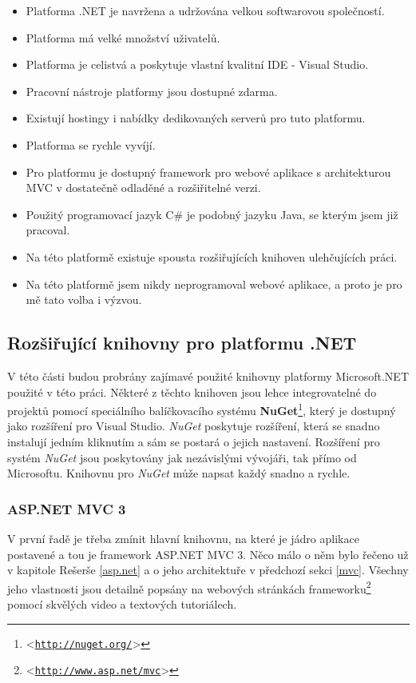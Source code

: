 \documentclass[11pt,twoside,a4paper]{book}
\let\oldUrl\url
\renewcommand\url[1]{<\texttt{\oldUrl{#1}}>}
\begin{document}
\begin{itemize}
\item Platforma .NET je navržena a udržována velkou softwarovou společností.
\item Platforma má velké množství uživatelů.
\item Platforma je celistvá a poskytuje vlastní kvalitní IDE - Visual Studio.
\item Pracovní nástroje platformy jsou dostupné zdarma.
\item Existují hostingy i nabídky dedikovaných serverů pro tuto platformu.
\item Platforma se rychle vyvíjí.
\item Pro platformu je dostupný framework pro webové aplikace s architekturou MVC v dostatečně odladěné a rozšiřitelné verzi.
\item Použitý programovací jazyk C\# je podobný jazyku Java, se kterým jsem již pracoval.
\item Na této platformě existuje spousta rozšiřujících knihoven ulehčujících práci.
\item Na této platformě jsem nikdy neprogramoval webové aplikace, a proto je pro mě tato volba i výzvou.
\end{itemize}


\subsection{Rozšiřující knihovny pro platformu .NET}
\label{subsec:roz}
V této části budou probrány zajímavé použité knihovny platformy Microsoft.NET použité v této práci. Některé z těchto knihoven jsou lehce integrovatelné do projektů pomocí speciálního balíčkovacího systému \textbf{NuGet}\footnote{\url{http://nuget.org/}}, který je dostupný jako rozšíření pro Visual Studio. \textit{NuGet} poskytuje rozšíření, která se snadno instalují jedním kliknutím a sám se postará o jejich nastavení. Rozšíření pro systém \textit{NuGet} jsou poskytovány jak nezávislými vývojáři, tak přímo od Microsoftu. Knihovnu pro \textit{NuGet} může napsat každý snadno a rychle.

\subsubsection{ASP.NET MVC 3}
V první řadě je třeba zmínit hlavní knihovnu, na které je jádro aplikace postavené a tou je framework ASP.NET MVC 3. Něco málo o něm bylo řečeno už v kapitole Rešerše \ref{asp.net} a o jeho architektuře v předchozí sekci \ref{mvc}. Všechny jeho vlastnosti jsou detailně popsány na webových stránkách frameworku\footnote{\url{http://www.asp.net/mvc}} pomocí skvělých video a textových tutoriálech.
 
\end{document}
